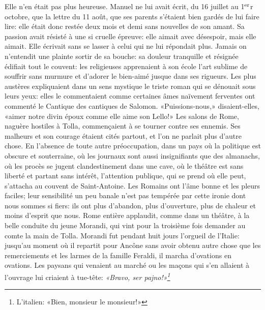 Elle n'en était pas plus heureuse. Manuel ne lui avait écrit, du 16 juillet au 1$\textsuperscript{er}$r octobre, que la lettre du 11 août, que ses parents s'étaient bien gardés de lui faire lire: elle était donc restée deux mois et demi sans nouvelles de son amant. Sa passion avait résisté à une si cruelle épreuve: elle aimait avec désespoir, mais elle aimait. Elle écrivait sans se lasser à celui qui ne lui répondait plus. Jamais on n'entendit une plainte sortir de sa bouche: sa douleur tranquille et résignée édifiait tout le couvent: les religieuses apprenaient à son école l'art sublime de souffrir sans murmure et d'adorer le bien-aimé jusque dans ses rigueurs. Les plus austères expliquaient dans un sens mystique le triste roman qui se dénouait sous leurs yeux: elles le commentaient comme certaines âmes naïvement ferventes ont commenté le Cantique des cantiques de Salomon. «Puissions-nous,» disaient-elles, «aimer notre divin époux comme elle aime son Lello!» Les salons de Rome, naguère hostiles à Tolla, commençaient à se tourner contre ses ennemis. Ses malheurs et son courage étaient cités partout, et l'on ne parlait plus d'autre chose. En l'absence de toute autre préoccupation, dans un pays où la politique est obscure et souterraine, où les journaux sont aussi insignifiants que des almanachs, où les procès se jugent clandestinement dans une cave, où le théâtre est sans liberté et partant sans intérêt, l'attention publique, qui se prend où elle peut, s'attacha au couvent de Saint-Antoine. Les Romains ont l'âme bonne et les pleurs faciles; leur sensibilité un peu banale n'est pas tempérée par cette ironie dont nous sommes si fiers: ils ont plus d'abandon, plus d'ouverture, plus de chaleur et moins d'esprit que nous. Rome entière applaudit, comme dans un théâtre, à la belle conduite du jeune Morandi, qui vint pour la troisième fois demander au comte la main de Tolla. Morandi fut pendant huit jours l'orgueil de l'Italie: jusqu'au moment où il repartit pour Ancône sans avoir obtenu autre chose que les remerciements et les larmes de la famille Feraldi, il marcha d'ovations en ovations. Les paysans qui venaient au marché ou les maçons qui s'en allaient à l'ouvrage lui criaient à tue-tête: \emph{«Bravo, ser pajno!»\footnote{
L'italien: «Bien, monsieur le monsieur!»
}}
